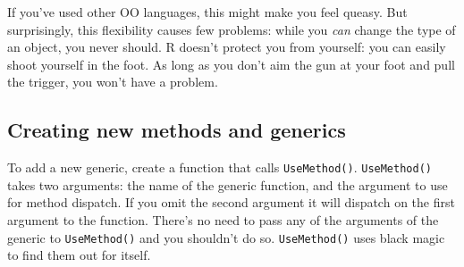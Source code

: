 \begin{Shaded}
\begin{Highlighting}[]
\StringTok{ }\NormalTok{(}\StringTok{ } 
\CommentTok{#> }
\CommentTok{#> }

\end{Highlighting}
\end{Shaded}

If you've used other OO languages, this might make you feel queasy. But
surprisingly, this flexibility causes few problems: while you \emph{can}
change the type of an object, you never should. R doesn't protect you
from yourself: you can easily shoot yourself in the foot. As long as you
don't aim the gun at your foot and pull the trigger, you won't have a
problem.

\subsection{Creating new methods and generics}

To add a new generic, create a function that calls \texttt{UseMethod()}.
\texttt{UseMethod()} takes two arguments: the name of the generic
function, and the argument to use for method dispatch. If you omit the
second argument it will dispatch on the first argument to the function.
There's no need to pass any of the arguments of the generic to
\texttt{UseMethod()} and you shouldn't do so. \texttt{UseMethod()} uses
black magic to find them out for itself. 

